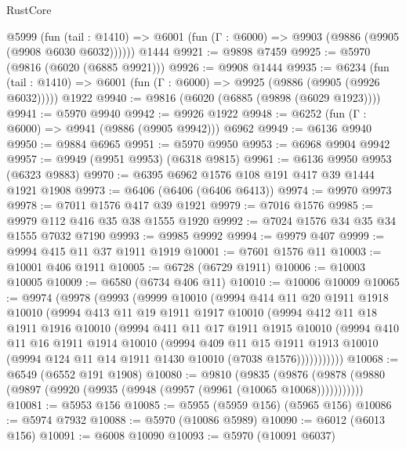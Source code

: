 \begin{lexlean}{RustCore}
\begin{coremodule}
{\begin{coremodule}
{{{{{{{{{{{{{{{{{{{{{{{{{{{{{{{{{{{{{{{{{{{{{    @5999
      (fun (tail : @1410) => @6001 (fun (Γ : @6000) => @9903 (@9886 (@9905 (@9908 @6030 @6032))))))
    @1444
@9921 := @9898 @7459
@9925 := @5970 (@9816 (@6020 (@6885 @9921)))
@9926 := @9908 @1444
@9935 := @6234
    (fun (tail : @1410) => @6001 (fun (Γ : @6000) => @9925 (@9886 (@9905 (@9926 @6032)))))
    @1922
@9940 := @9816 (@6020 (@6885 (@9898 (@6029 @1923))))
@9941 := @5970 @9940
@9942 := @9926 @1922
@9948 := @6252 (fun (Γ : @6000) => @9941 (@9886 (@9905 @9942))) @6962
@9949 := @6136 @9940
@9950 := @9884 @6965
@9951 := @5970 @9950
@9953 := @6968 @9904 @9942
@9957 := @9949 (@9951 @9953) (@6318 @9815)
@9961 := @6136 @9950 @9953 (@6323 @9883)
@9970 := @6395 @6962 @1576 @108 @191 @417 @39 @1444 @1921 @1908
@9973 := @6406 (@6406 (@6406 @6413))
@9974 := @9970 @9973
@9978 := @7011 @1576 @417 @39 @1921
@9979 := @7016 @1576
@9985 := @9979 @112 @416 @35 @38 @1555 @1920
@9992 := @7024 @1576 @34 @35 @34 @1555 @7032 @7190
@9993 := @9985 @9992
@9994 := @9979 @407
@9999 := @9994 @415 @11 @37 @1911 @1919
@10001 := @7601 @1576 @11
@10003 := @10001 @406 @1911
@10005 := @6728 (@6729 @1911)
@10006 := @10003 @10005
@10009 := @6580 (@6734 @406 @11)
@10010 := @10006 @10009
@10065 := @9974
    (@9978
      (@9993
        (@9999
          @10010
          (@9994
            @414
            @11
            @20
            @1911
            @1918
            @10010
            (@9994
              @413
              @11
              @19
              @1911
              @1917
              @10010
              (@9994
                @412
                @11
                @18
                @1911
                @1916
                @10010
                (@9994
                  @411
                  @11
                  @17
                  @1911
                  @1915
                  @10010
                  (@9994
                    @410
                    @11
                    @16
                    @1911
                    @1914
                    @10010
                    (@9994
                      @409
                      @11
                      @15
                      @1911
                      @1913
                      @10010
                      (@9994 @124 @11 @14 @1911 @1430 @10010 (@7038 @1576)))))))))))
@10068 := @6549 (@6552 @191 @1908)
@10080 := @9810
    (@9835 (@9876 (@9878 (@9880 (@9897 (@9920 (@9935 (@9948 (@9957 (@9961 (@10065 @10068)))))))))))
@10081 := @5953 @156
@10085 := @5955 (@5959 @156) (@5965 @156)
@10086 := @5974 @7932
@10088 := @5970 (@10086 @5989)
@10090 := @6012 (@6013 @156)
@10091 := @6008 @10090
@10093 := @5970 (@10091 @6037)
}}}}}}}}}}}}}}}}}}}}}}}}}}}}}}}}}}}}}}}}}}}}}
\end{coremodule}}
\end{coremodule}
\end{lexlean}
